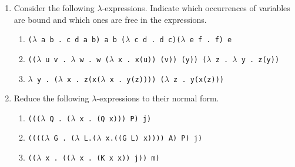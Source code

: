 \documentclass [11pt, a4wide, twoside]{article}
\begin{document}
\noindent
%
\begin{enumerate}
\item Consider the following $\lambda$-expressions. Indicate which occurrences of
variables are bound and which ones are free in the expressions.
\begin{enumerate}
\item \texttt{($\lambda$ a b .~c d a b) a b ($\lambda$ c d .~d c)($\lambda$ e f .~f) e} \vspace{1cm}

\item \texttt{(($\lambda$ u v .~$\lambda$ w .~w ($\lambda$ x .~x(u)) (v)) (y)) ($\lambda$ z .~$\lambda$ y .~z(y))}\vspace{1cm}

\item \texttt{$\lambda$ y .~($\lambda$ x .~z(x($\lambda$ x .~y(z)))) ($\lambda$ z .~y(x(z)))}\vspace{1cm}
\end{enumerate}

\solution{\fontsize{9pt}{11pt}}

\item Reduce the following $\lambda$-expressions to their normal form.
\begin{enumerate}
\item \texttt{((($\lambda$ Q . ($\lambda$ x . (Q x))) P) j)} \vspace{4cm}


\item \texttt{(((($\lambda$ G . ($\lambda$ L.($\lambda$ x.((G L) x)))) A) P) j)}\vspace{4cm}


\item \texttt{(($\lambda$ x . (($\lambda$ x . (K x x)) j)) m)}\vspace{4cm}
\end{enumerate}
\end{enumerate}




\newpage


\newpage
\end{document}
